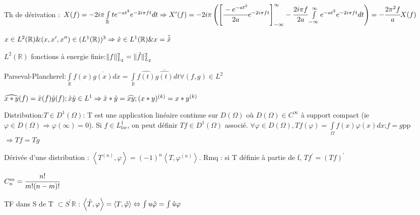 \documentclass[10pt,a4paper]{article}
\begin{document}
\begin{multicols}{2}
Th de dérivation : $X(f) = -2i\pi\int\limits_\mathbb{R}te^{-at^2}e^{-2i\pi ft}dt \Rightarrow X^\prime(f)=-2i\pi\left(\left[\cfrac{-e^{-at^2}}{2a}e^{-2i\pi ft}\right]^\infty_{-\infty} - \cfrac{2i\pi f}{2a} \int\limits^\infty_{-\infty} e^{-at^2}e^{-2i\pi ft}dt\right) = -\cfrac{2\pi^2f}{a} X(f)$

$x\in L^2(\mathbb{R}) \& (x,x^\prime,x^{\prime\prime})\in(L^1(\mathbb{R}))^3 \Rightarrow \Hat{x}\in L^1(\mathbb{R}) \& x = \Check{\Hat{x}}$

$L^2(\mathbb{R})$ fonctions à energie finie:$\|f\|^2_{L_2}=\|\Hat{f}\|^2_{L_2}$

Parseval-Plancherel:$\int\limits_\mathbb{R}f(x)\overline{g(x)}dx=\int\limits_\mathbb{R}\widehat{f(t)}\overline{\widehat{g(t)}}dt \forall(f,g)\in L^2$

$\widehat{x\ast y}(f) = \Hat{x}(f)\Hat{y}(f);\Hat{x}\Hat{y}\in L^1 \Rightarrow \Hat{x}\ast\Hat{y}=\widehat{xy};(x\ast y)^{(k)} = x\ast y^{(k)}$

Distribution:$T\in D^1(\Omega)$: T est une application linéaire continue sur $D(\Omega)$ où $D(\Omega) \in C^\infty$ à support compact (ie $\varphi\in D(\Omega)\Rightarrow\varphi(\infty)=0$). Si $f\in L^1_{loc}$, on peut définir $Tf\in D^1(\Omega)$ associé. $\forall\varphi\in D(\Omega), Tf(\varphi) = \int\limits_\Omega f(x)\varphi(x)dx$;$f=g$pp$\Rightarrow Tf=Tg$

Dérivée d'une distribution : $\left\langle T^{(n)},\varphi\right\rangle=(-1)^n\left\langle T,\varphi^{(n)}\right\rangle$. Rmq : si T définie à partie de f, $Tf^\prime = (Tf)^\prime$

$C^m_n=\cfrac{n!}{m!(n-m)!}$

TF dans S de T $\subset S^\prime{\mathbb{R}}$ : $\left\langle\hat{T},\varphi\right\rangle=\left\langle T,\Hat{\varphi}\right\rangle \Leftrightarrow \int u\Hat{\varphi} = \int\Hat{u}\varphi$




\end{multicols}
\end{document}
